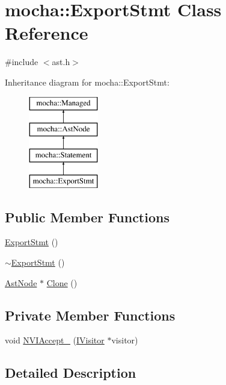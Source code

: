 \hypertarget{classmocha_1_1_export_stmt}{
\section{mocha::ExportStmt Class Reference}
\label{classmocha_1_1_export_stmt}
}


{\ttfamily \#include $<$ast.h$>$}

Inheritance diagram for mocha::ExportStmt:\begin{figure}[H]
\begin{center}
\leavevmode
\includegraphics[height=4.000000cm]{classmocha_1_1_export_stmt}
\end{center}
\end{figure}
\subsection*{Public Member Functions}
\begin{DoxyCompactItemize}
\item 
\hyperlink{classmocha_1_1_export_stmt_ad76b63ebbff49b0c00bec75463b511e2}{ExportStmt} ()
\item 
\hyperlink{classmocha_1_1_export_stmt_a1cf91a0335e69f80be808933e55b5bc0}{$\sim$ExportStmt} ()
\item 
\hyperlink{classmocha_1_1_ast_node}{AstNode} $\ast$ \hyperlink{classmocha_1_1_export_stmt_a8ee0d362e91d567f7dda582c07fc9759}{Clone} ()
\end{DoxyCompactItemize}
\subsection*{Private Member Functions}
\begin{DoxyCompactItemize}
\item 
void \hyperlink{classmocha_1_1_export_stmt_a7cda610c60ff845128e6ec191552df05}{NVIAccept\_\-} (\hyperlink{classmocha_1_1_i_visitor}{IVisitor} $\ast$visitor)
\end{DoxyCompactItemize}


\subsection{Detailed Description}



